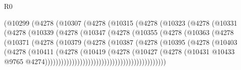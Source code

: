 \begin{lexlean}{R0}
\begin{coremodule}
                        (@10299
                          (@4278
                            (@10307
                              (@4278
                                (@10315
                                  (@4278
                                    (@10323
                                      (@4278
                                        (@10331
                                          (@4278
                                            (@10339
                                              (@4278
                                                (@10347
                                                  (@4278
                                                    (@10355
                                                      (@4278
                                                        (@10363
                                                          (@4278
                                                            (@10371
                                                              (@4278
                                                                (@10379
                                                                  (@4278
                                                                    (@10387
                                                                      (@4278
                                                                        (@10395
                                                                          (@4278
                                                                            (@10403
                                                                              (@4278
                                                                                (@10411
                                                                                  (@4278
                                                                                    (@10419
                                                                                      (@4278
                                                                                        (@10427
                                                                                          (@4278
                                                                                            (@10431
                                                                                              @10433
                                                                                              @9765
                                                                                              @4274)))))))))))))))))))))))))))))))))))))))))))))

\end{coremodule}
\end{lexlean}
